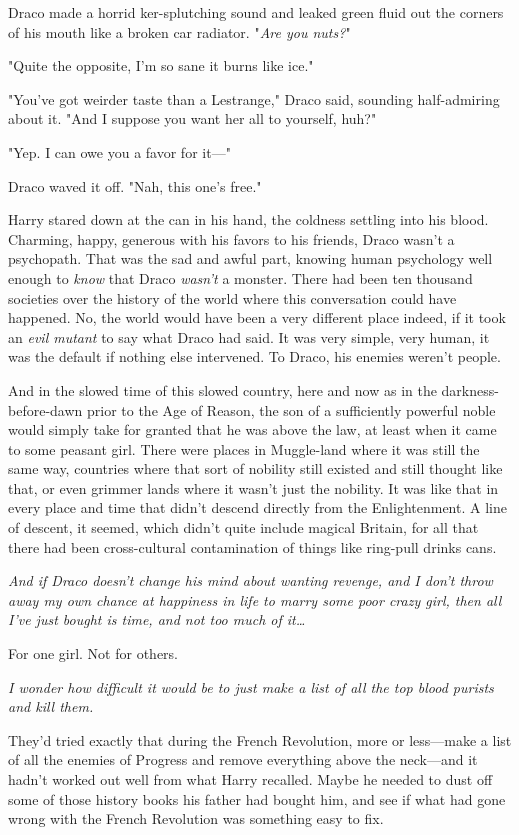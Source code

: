 Draco made a horrid ker-splutching sound and leaked green fluid out the corners
of his mouth like a broken car radiator. "\emph{Are you nuts?}"

"Quite the opposite, I'm so sane it burns like ice."

"You've got weirder taste than a Lestrange," Draco said, sounding half-admiring
about it. "And I suppose you want her all to yourself, huh?"

"Yep. I can owe you a favor for it---"

Draco waved it off. "Nah, this one's free."

Harry stared down at the can in his hand, the coldness settling into his blood.
Charming, happy, generous with his favors to his friends, Draco wasn't a
psychopath. That was the sad and awful part, knowing human psychology well
enough to \emph{know} that Draco \emph{wasn't} a monster. There had been ten
thousand societies over the history of the world where this conversation could
have happened. No, the world would have been a very different place indeed, if
it took an \emph{evil mutant} to say what Draco had said. It was very simple,
very human, it was the default if nothing else intervened. To Draco, his
enemies weren't people.

And in the slowed time of this slowed country, here and now as in the
darkness-before-dawn prior to the Age of Reason, the son of a sufficiently
powerful noble would simply take for granted that he was above the law, at
least when it came to some peasant girl. There were places in Muggle-land where
it was still the same way, countries where that sort of nobility still existed
and still thought like that, or even grimmer lands where it wasn't just the
nobility. It was like that in every place and time that didn't descend directly
from the Enlightenment. A line of descent, it seemed, which didn't quite
include magical Britain, for all that there had been cross-cultural
contamination of things like ring-pull drinks cans.

\emph{And if Draco doesn't change his mind about wanting revenge, and I don't
throw away my own chance at happiness in life to marry some poor crazy girl,
then all I've just bought is time, and not too much of it{\ldots}}

For one girl. Not for others.

\emph{I wonder how difficult it would be to just make a list of all the top
blood purists and kill them.}

They'd tried exactly that during the French Revolution, more or less---make a
list of all the enemies of Progress and remove everything above the neck---and
it hadn't worked out well from what Harry recalled. Maybe he needed to dust off
some of those history books his father had bought him, and see if what had gone
wrong with the French Revolution was something easy to fix.

